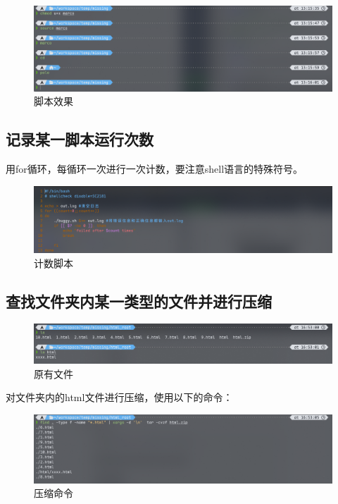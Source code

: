 \documentclass[fontset=ubuntu]{ctexart}
\begin{document}
\begin{sloppypar}
\begin{figure}[htb]
    \centering
    \includegraphics[width=0.75\linewidth]{polo_1.png}
    \caption{脚本效果}
    \label{fig:polo_1}
\end{figure}

\subsection{记录某一脚本运行次数}
用for循环，每循环一次进行一次计数，要注意shell语言的特殊符号。
\begin{figure}[htb]
    \centering
    \includegraphics[width=0.75\linewidth]{debug_1.png}
    \caption{计数脚本}
    \label{fig:debug_1}
\end{figure}

\subsection{查找文件夹内某一类型的文件并进行压缩}
\begin{figure}[htb]
    \centering
    \includegraphics[width=0.75\linewidth]{html_1.png}
    \caption{原有文件}
    \label{fig:html_1}
\end{figure}
对文件夹内的html文件进行压缩，使用以下的命令：
\begin{figure}[htb]
    \centering
    \includegraphics[width=0.75\linewidth]{tar_1.png}
    \caption{压缩命令}
    \label{fig:tar_1}
\end{figure}


\end{sloppypar}
\end{document}
